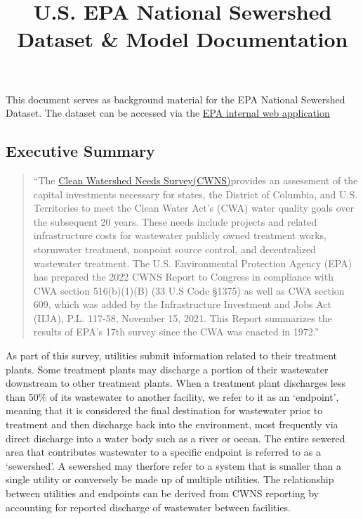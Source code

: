 \documentclass[
  letterpaper,
  DIV=11,
  numbers=noendperiod]{scrartcl}
\title{U.S. EPA National Sewershed Dataset \& Model Documentation}
\author{}
\date{}
\renewcommand*\contentsname{Table of contents}
\newcommand\contentsname{Table of contents}
\begin{document}
\maketitle

\renewcommand*\contentsname{Table of contents}
{
\hypersetup{linkcolor=}
\setcounter{tocdepth}{3}
\tableofcontents
}
This document serves as background material for the EPA National
Sewershed Dataset. The dataset can be accessed via the
\href{https://epa.maps.arcgis.com/apps/instant/atlas/index.html?appid=5b098638234349dd8dca7f764e7aa4e3}{EPA
internal web application}

\subsection{Executive Summary}\label{executive-summary}

\begin{quote}
``The
\href{https://www.epa.gov/cwns/clean-watersheds-needs-survey-cwns-2022-report-and-data}{Clean
Watershed Needs Survey(CWNS)}provides an assessment of the capital
investments necessary for states, the District of Columbia, and U.S.
Territories to meet the Clean Water Act's (CWA) water quality goals over
the subsequent 20 years. These needs include projects and related
infrastructure costs for wastewater publicly owned treatment works,
stormwater treatment, nonpoint source control, and decentralized
wastewater treatment. The U.S. Environmental Protection Agency (EPA) has
prepared the 2022 CWNS Report to Congress in compliance with CWA section
516(b)(1)(B) (33 U.S Code §1375) as well as CWA section 609, which was
added by the Infrastructure Investment and Jobs Act (IIJA), P.L. 117-58,
November 15, 2021. This Report summarizes the results of EPA's 17th
survey since the CWA was enacted in 1972.''
\end{quote}

As part of this survey, utilities submit information related to their
treatment plants. Some treatment plants may discharge a portion of their
wastewater downstream to other treatment plants. When a treatment plant
discharges less than 50\% of its wastewater to another facility, we
refer to it as an `endpoint', meaning that it is considered the final
destination for wastewater prior to treatment and then discharge back
into the environment, most frequently via direct discharge into a water
body such as a river or ocean. The entire sewered area that contributes
wastewater to a specific endpoint is referred to as a `sewershed'. A
sewershed may therfore refer to a system that is smaller than a single
utility or conversely be made up of multiple utilities. The relationship
between utilities and endpoints can be derived from CWNS reporting by
accounting for reported discharge of wastewater between facilities.
\end{document}
